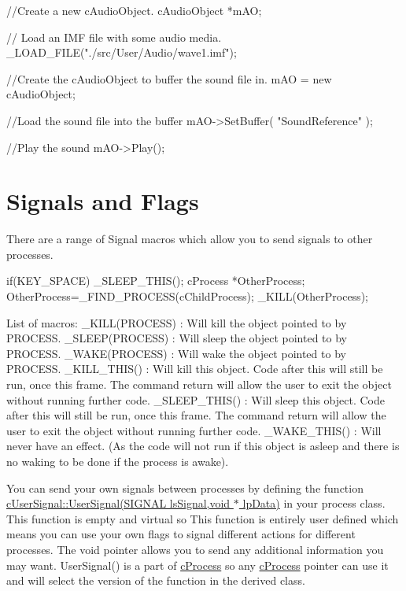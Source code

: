 \begin{DoxyCode}
 //Create a new cAudioObject.
 cAudioObject *mAO;

 // Load an IMF file with some audio media.
 _LOAD_FILE("./src/User/Audio/wave1.imf");

 //Create the cAudioObject to buffer the sound file in.
 mAO = new cAudioObject;

 //Load the sound file into the buffer
 mAO->SetBuffer( "SoundReference" );

 //Play the sound
 mAO->Play();
\end{DoxyCode}
\hypertarget{_using_engine_page_SignalsPage}{}\section{Signals and Flags}\label{_using_engine_page_SignalsPage}
There are a range of Signal macros which allow you to send signals to other processes. 
\begin{DoxyCode}
 if(KEY_SPACE) _SLEEP_THIS();
 cProcess *OtherProcess;
 OtherProcess=_FIND_PROCESS(cChildProcess);
 _KILL(OtherProcess);
\end{DoxyCode}
 \par
 \par
 List of macros: \_\-KILL(PROCESS) : Will kill the object pointed to by PROCESS. \_\-SLEEP(PROCESS) : Will sleep the object pointed to by PROCESS. \_\-WAKE(PROCESS) : Will wake the object pointed to by PROCESS. \_\-KILL\_\-THIS() : Will kill this object. Code after this will still be run, once this frame. The command return will allow the user to exit the object without running further code. \_\-SLEEP\_\-THIS() : Will sleep this object. Code after this will still be run, once this frame. The command return will allow the user to exit the object without running further code. \_\-WAKE\_\-THIS() : Will never have an effect. (As the code will not run if this object is asleep and there is no waking to be done if the process is awake).

You can send your own signals between processes by defining the function \hyperlink{classc_user_signal_a2f7ada3ca4ee80e2082e12a97b450221}{cUserSignal::UserSignal(SIGNAL lsSignal,void $\ast$ lpData)} in your process class. This function is empty and virtual so This function is entirely user defined which means you can use your own flags to signal different actions for different processes. The void pointer allows you to send any additional information you may want. UserSignal() is a part of \hyperlink{classc_process}{cProcess} so any \hyperlink{classc_process}{cProcess} pointer can use it and will select the version of the function in the derived class. \par


